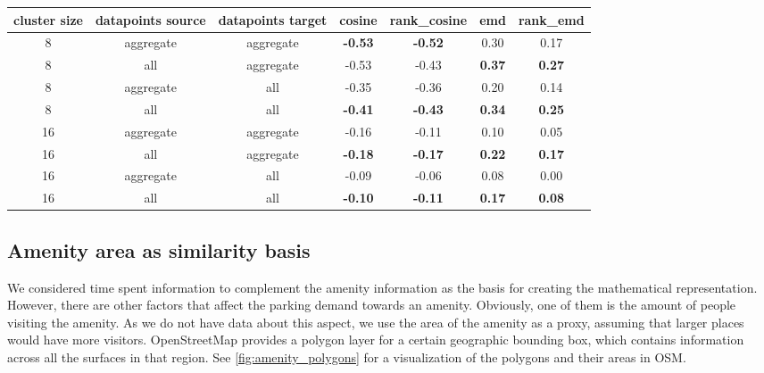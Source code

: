 	\begin{table}[!ht]
		{\begin{tabular}{ | c | c | c | c | c | c | c | }
				\hline
				{cluster size} & {datapoints source} & {datapoints target} & cosine & rank\_cosine & emd & rank\_emd \\ \hline
				8	&	aggregate 	&	aggregate 	& 	\textbf{-0.53}	&	\textbf{-0.52}	&	0.30	&	0.17 	\\ \hline
				8	&	all 		&	aggregate 	& 	-0.53	&	-0.43	&	\textbf{0.37}	&	\textbf{0.27}	\\ \hline \hline
				8	&	aggregate 	&	all 		& 	-0.35	&	-0.36	&	0.20	&	0.14	\\ \hline
				8	&	all			& 	all 		&	\textbf{-0.41}	&	\textbf{-0.43}	&	\textbf{0.34}	&	\textbf{0.25}	\\ \hline \hline
				16	&	aggregate	& 	aggregate 	&	-0.16	&	-0.11	&	0.10	&	0.05	\\ \hline
				16	&	all			& 	aggregate 	& 	\textbf{-0.18}	&	\textbf{-0.17}	&	\textbf{0.22}	&	\textbf{0.17}	\\ \hline \hline
				16	&	aggregate	& 	all 		& 	-0.09	&	-0.06	&	0.08	&	0.00	\\ \hline
				16	&	all			&	all 		&	\textbf{-0.10}	&	\textbf{-0.11}	&	\textbf{0.17}	&	\textbf{0.08}	\\ \hline \hline
		\end{tabular}}
		\label{tab:correlation_values}
	\end{table}
						
	\subsection{Amenity area as similarity basis}
	We considered time spent information to complement the amenity information as the basis for creating the mathematical representation. However, there are other factors that affect the parking demand towards an amenity.
	Obviously, one of them is the amount of people visiting the amenity.
	As we do not have data about this aspect, we use the area of the amenity as a proxy, assuming that larger places would have more visitors.
	OpenStreetMap provides a polygon layer for a certain geographic bounding box, which contains information across all the surfaces in that region. See \cref{fig:amenity_polygons} for a visualization of the polygons and their areas in OSM. 
	
